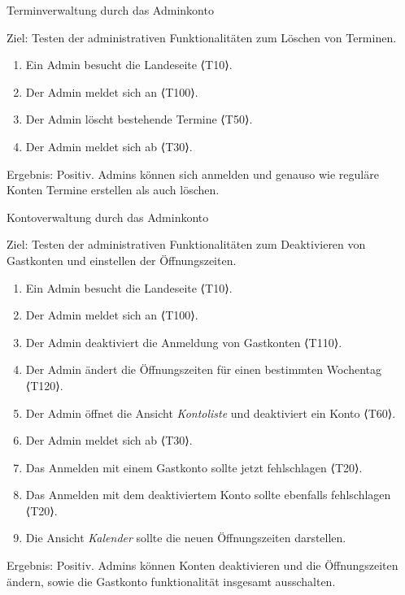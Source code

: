 \begin{scenario}{30}{Terminverwaltung durch das Adminkonto}
    \item[Ziel:] Testen der administrativen Funktionalitäten zum Löschen von Terminen.
    \begin{enumerate}
        \item Ein Admin besucht die Landeseite ⟨T10⟩.
        \item Der Admin meldet sich an ⟨T100⟩.
        \item Der Admin löscht bestehende Termine ⟨T50⟩.
        \item Der Admin meldet sich ab ⟨T30⟩.
    \end{enumerate}
    \item[Ergebnis:] Positiv.
    Admins können sich anmelden und genauso wie reguläre Konten Termine erstellen als auch löschen.
\end{scenario}

\pagebreak

\begin{scenario}{40}{Kontoverwaltung durch das Adminkonto}
    \item[Ziel:] Testen der administrativen Funktionalitäten zum Deaktivieren von Gastkonten und einstellen der Öffnungszeiten.
    \begin{enumerate}
        \item Ein Admin besucht die Landeseite ⟨T10⟩.
        \item Der Admin meldet sich an ⟨T100⟩.
        \item Der Admin deaktiviert die Anmeldung von Gastkonten ⟨T110⟩.
        \item Der Admin ändert die Öffnungszeiten für einen bestimmten Wochentag ⟨T120⟩.
        \item Der Admin öffnet die Ansicht \textit{Kontoliste} und deaktiviert ein Konto ⟨T60⟩.
        \item Der Admin meldet sich ab ⟨T30⟩.
        \item Das Anmelden mit einem Gastkonto sollte jetzt fehlschlagen ⟨T20⟩.
        \item Das Anmelden mit dem deaktiviertem Konto sollte ebenfalls fehlschlagen ⟨T20⟩.
        \item Die Ansicht \textit{Kalender} sollte die neuen Öffnungszeiten darstellen.
    \end{enumerate}
    \item[Ergebnis:] Positiv.
    Admins können Konten deaktivieren und die Öffnungszeiten ändern, sowie die Gastkonto funktionalität insgesamt ausschalten.
\end{scenario}

